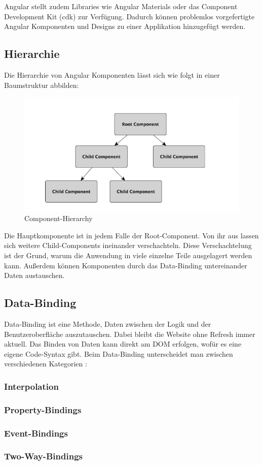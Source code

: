 Angular stellt zudem Libraries wie Angular Materials oder das Component Development Kit (cdk) zur Verfügung. Dadurch können problemlos vorgefertigte Angular Komponenten und Designs zu einer Applikation hinzugefügt werden.

\subsection{Hierarchie}
Die Hierarchie von Angular Komponenten lässt sich wie folgt in einer Baumstruktur abbilden:

\begin{figure} [h t]
    \centering
    \includegraphics[scale=0.6]{pics/hierarchy.PNG}
    \caption{Component-Hierarchy \cite{AngularBuch}}
    \label{fig:tech:front:component-hierarchy}
  \end{figure}
Die Hauptkomponente ist in jedem Falle der Root-Component. Von ihr aus lassen sich weitere Child-Components ineinander verschachteln. Diese Verschachtelung ist der Grund, warum die Anwendung in viele einzelne Teile ausgelagert werden kann. Außerdem können Komponenten durch das Data-Binding untereinander Daten austauschen.

\subsection{Data-Binding}
Data-Binding ist eine Methode, Daten zwischen der Logik und der Benutzeroberfläche auszutauschen. Dabei bleibt die Website ohne Refresh immer aktuell. Das Binden von Daten kann direkt am DOM erfolgen, wofür es eine eigene Code-Syntax gibt. Beim Data-Binding unterscheidet man zwischen verschiedenen Kategorien \cite{AngularBuch} \cite{BindingSyntax}:  

\subsubsection{Interpolation}
\subsubsection{Property-Bindings}
\subsubsection{Event-Bindings}
\subsubsection{Two-Way-Bindings}